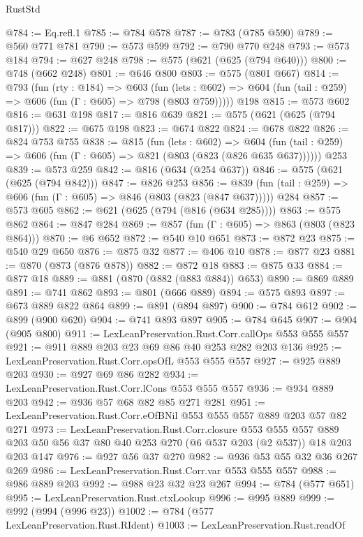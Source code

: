 \begin{lexlean}{RustStd}
\begin{coremodule}
@784 := Eq.refl.{1}
@785 := @784 @578
@787 := @783 (@785 @590)
@789 := @560 @771 @781
@790 := @573 @599
@792 := @790 @770 @248
@793 := @573 @184
@794 := @627 @248
@798 := @575 (@621 (@625 (@794 @640)))
@800 := @748 (@662 @248)
@801 := @646 @800
@803 := @575 (@801 @667)
@814 := @793
    (fun (rty : @184) =>
    @603
      (fun (lets : @602) => @604 (fun (tail : @259) => @606 (fun (Γ : @605) => @798 (@803 @759)))))
    @198
@815 := @573 @602
@816 := @631 @198
@817 := @816 @639
@821 := @575 (@621 (@625 (@794 @817)))
@822 := @675 @198
@823 := @674 @822
@824 := @678 @822
@826 := @824 @753 @755
@838 := @815
    (fun (lets : @602) =>
    @604 (fun (tail : @259) => @606 (fun (Γ : @605) => @821 (@803 (@823 (@826 @635 @637))))))
    @253
@839 := @573 @259
@842 := @816 (@634 (@254 @637))
@846 := @575 (@621 (@625 (@794 @842)))
@847 := @826 @253
@856 := @839 (fun (tail : @259) => @606 (fun (Γ : @605) => @846 (@803 (@823 (@847 @637))))) @284
@857 := @573 @605
@862 := @621 (@625 (@794 (@816 (@634 @285))))
@863 := @575 @862
@864 := @847 @284
@869 := @857 (fun (Γ : @605) => @863 (@803 (@823 @864)))
@870 := @6 @652
@872 := @540 @10 @651
@873 := @872 @23
@875 := @540 @29 @650
@876 := @875 @32
@877 := @406 @10
@878 := @877 @23
@881 := @870 (@873 (@876 @878))
@882 := @872 @18
@883 := @875 @33
@884 := @877 @18
@889 := @881 (@870 (@882 (@883 @884)) @653)
@890 := @869 @889
@891 := @741 @862
@893 := @801 (@666 @889)
@894 := @575 @893
@897 := @673 @889 @822 @864
@899 := @891 (@894 @897)
@900 := @784 @612
@902 := @899 (@900 @620)
@904 := @741 @893 @897
@905 := @784 @645
@907 := @904 (@905 @800)
@911 := LexLeanPreservation.Rust.Corr.callOps @553 @555 @557
@921 := @911 @889 @203 @23 @69 @86 @40 @253 @282 @203 @136
@925 := LexLeanPreservation.Rust.Corr.opsOfL @553 @555 @557
@927 := @925 @889 @203
@930 := @927 @69 @86 @282
@934 := LexLeanPreservation.Rust.Corr.lCons @553 @555 @557
@936 := @934 @889 @203
@942 := @936 @57 @68 @82 @85 @271 @281
@951 := LexLeanPreservation.Rust.Corr.eOfBNil @553 @555 @557 @889 @203 @57 @82 @271
@973 := LexLeanPreservation.Rust.Corr.closure
    @553
    @555
    @557
    @889
    @203
    @50
    @56
    @37
    @80
    @40
    @253
    @270
    (@6 @537 @203 (@2 @537))
    @18
    @203
    @203
    @147
@976 := @927 @56 @37 @270
@982 := @936 @53 @55 @32 @36 @267 @269
@986 := LexLeanPreservation.Rust.Corr.var @553 @555 @557
@988 := @986 @889 @203
@992 := @988 @23 @32 @23 @267
@994 := @784 (@577 @651)
@995 := LexLeanPreservation.Rust.ctxLookup
@996 := @995 @889
@999 := @992 (@994 (@996 @23))
@1002 := @784 (@577 LexLeanPreservation.Rust.RIdent)
@1003 := LexLeanPreservation.Rust.readOf

\end{coremodule}
\end{lexlean}
